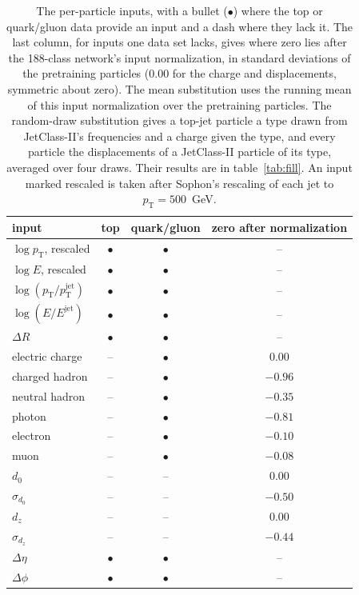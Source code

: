 \begin{table}[t]
\centering
\caption{The per-particle inputs, with a bullet ($\bullet$) where the top or quark/gluon data provide an input and a dash where they lack it. The last column, for inputs one data set lacks, gives where zero lies after the 188-class network's input normalization, in standard deviations of the pretraining particles (0.00 for the charge and displacements, symmetric about zero). The mean substitution uses the running mean of this input normalization over the pretraining particles. The random-draw substitution gives a top-jet particle a type drawn from JetClass-II's frequencies and a charge given the type, and every particle the displacements of a JetClass-II particle of its type, averaged over four draws. Their results are in table~\ref{tab:fill}. An input marked rescaled is taken after Sophon's rescaling of each jet to $p_{\mathrm{T}}=500$~GeV.}
\label{tab:inputs}
\begin{tabular*}{\linewidth}{@{\extracolsep{\fill}}lccc@{}}
\toprule
input & top & quark/gluon & zero after normalization \\
\midrule
$\log p_{\mathrm{T}}$, rescaled & $\bullet$ & $\bullet$ & -- \\
$\log E$, rescaled & $\bullet$ & $\bullet$ & -- \\
$\log(p_{\mathrm{T}}/p_{\mathrm{T}}^{\mathrm{jet}})$ & $\bullet$ & $\bullet$ & -- \\
$\log(E/E^{\mathrm{jet}})$ & $\bullet$ & $\bullet$ & -- \\
$\Delta R$ & $\bullet$ & $\bullet$ & -- \\
electric charge & -- & $\bullet$ & $0.00$ \\
charged hadron & -- & $\bullet$ & $-0.96$ \\
neutral hadron & -- & $\bullet$ & $-0.35$ \\
photon & -- & $\bullet$ & $-0.81$ \\
electron & -- & $\bullet$ & $-0.10$ \\
muon & -- & $\bullet$ & $-0.08$ \\
$d_0$ & -- & -- & $0.00$ \\
$\sigma_{d_0}$ & -- & -- & $-0.50$ \\
$d_z$ & -- & -- & $0.00$ \\
$\sigma_{d_z}$ & -- & -- & $-0.44$ \\
$\Delta\eta$ & $\bullet$ & $\bullet$ & -- \\
$\Delta\phi$ & $\bullet$ & $\bullet$ & -- \\
\bottomrule
\end{tabular*}
\end{table}
